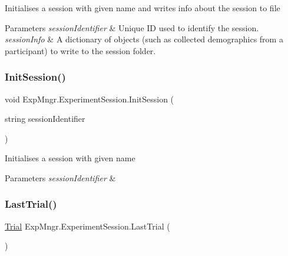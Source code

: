 Initialises a session with given name and writes info about the session to file 


\begin{DoxyParams}{Parameters}
{\em session\+Identifier} & Unique ID used to identify the session.\\
\hline
{\em session\+Info} & A dictionary of objects (such as collected demographics from a participant) to write to the session folder.\\
\hline
\end{DoxyParams}
\mbox{\label{class_exp_mngr_1_1_experiment_session_aa97a6a087d184a53ed679e499c3829f7}} 
\subsubsection{\texorpdfstring{Init\+Session()}{InitSession()}\hspace{0.1cm}{\footnotesize\ttfamily [2/2]}}
{\footnotesize\ttfamily void Exp\+Mngr.\+Experiment\+Session.\+Init\+Session (\begin{DoxyParamCaption}\item[{string}]{session\+Identifier }\end{DoxyParamCaption})}



Initialises a session with given name 


\begin{DoxyParams}{Parameters}
{\em session\+Identifier} & \\
\hline
\end{DoxyParams}
\mbox{\label{class_exp_mngr_1_1_experiment_session_a7f3fc46b3284c9739f8b1805d23f737a}} 
\subsubsection{\texorpdfstring{Last\+Trial()}{LastTrial()}}
{\footnotesize\ttfamily \hyperlink{class_exp_mngr_1_1_trial}{Trial} Exp\+Mngr.\+Experiment\+Session.\+Last\+Trial (\begin{DoxyParamCaption}{ }\end{DoxyParamCaption})}



